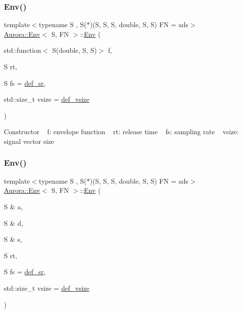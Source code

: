 \subsubsection{\texorpdfstring{Env()}{Env()}\hspace{0.1cm}{\footnotesize\ttfamily [1/3]}}
{\footnotesize\ttfamily template$<$typename S , S($\ast$)(\+S, S, S, double, S, S) FN = ads$>$ \\
\hyperlink{class_aurora_1_1_env}{Aurora\+::\+Env}$<$ S, FN $>$\+::\hyperlink{class_aurora_1_1_env}{Env} (\begin{DoxyParamCaption}\item[{std\+::function$<$ S(double, S, S)$>$}]{f,  }\item[{S}]{rt,  }\item[{S}]{fs = {\ttfamily \hyperlink{namespace_aurora_ad49263d809bea98dd422e95bc91bc03e}{def\+\_\+sr}},  }\item[{std\+::size\+\_\+t}]{vsize = {\ttfamily \hyperlink{namespace_aurora_afaaddf667a06e7ce23c667a8b7295263}{def\+\_\+vsize}} }\end{DoxyParamCaption})\hspace{0.3cm}{\ttfamily [inline]}}

Constructor ~\newline
f\+: envelope function ~\newline
rt\+: release time ~\newline
fs\+: sampling rate ~\newline
vsize\+: signal vector size \mbox{\label{class_aurora_1_1_env_a7a019299406bd5a3f8842194c0cbce09}} 
\subsubsection{\texorpdfstring{Env()}{Env()}\hspace{0.1cm}{\footnotesize\ttfamily [2/3]}}
{\footnotesize\ttfamily template$<$typename S , S($\ast$)(\+S, S, S, double, S, S) FN = ads$>$ \\
\hyperlink{class_aurora_1_1_env}{Aurora\+::\+Env}$<$ S, FN $>$\+::\hyperlink{class_aurora_1_1_env}{Env} (\begin{DoxyParamCaption}\item[{S \&}]{a,  }\item[{S \&}]{d,  }\item[{S \&}]{s,  }\item[{S}]{rt,  }\item[{S}]{fs = {\ttfamily \hyperlink{namespace_aurora_ad49263d809bea98dd422e95bc91bc03e}{def\+\_\+sr}},  }\item[{std\+::size\+\_\+t}]{vsize = {\ttfamily \hyperlink{namespace_aurora_afaaddf667a06e7ce23c667a8b7295263}{def\+\_\+vsize}} }\end{DoxyParamCaption})\hspace{0.3cm}{\ttfamily [inline]}}

